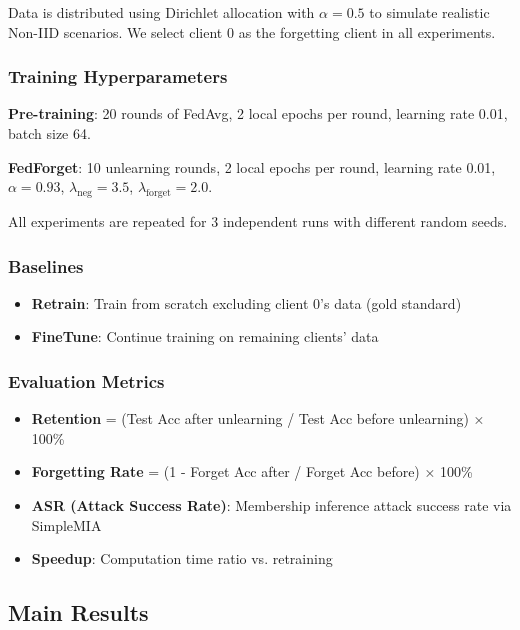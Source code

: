\documentclass[11pt,a4paper]{article}
\begin{document}
Data is distributed using Dirichlet allocation with $\alpha=0.5$ to simulate realistic Non-IID scenarios. We select client 0 as the forgetting client in all experiments.

\subsubsection{Training Hyperparameters}

\textbf{Pre-training}: 20 rounds of FedAvg, 2 local epochs per round, learning rate 0.01, batch size 64.

\textbf{FedForget}: 10 unlearning rounds, 2 local epochs per round, learning rate 0.01, $\alpha=0.93$, $\lambda_{\text{neg}}=3.5$, $\lambda_{\text{forget}}=2.0$.

All experiments are repeated for 3 independent runs with different random seeds.

\subsubsection{Baselines}

\begin{itemize}
\item \textbf{Retrain}: Train from scratch excluding client 0's data (gold standard)
\item \textbf{FineTune}: Continue training on remaining clients' data
\end{itemize}

\subsubsection{Evaluation Metrics}

\begin{itemize}
\item \textbf{Retention} = (Test Acc after unlearning / Test Acc before unlearning) × 100\%
\item \textbf{Forgetting Rate} = (1 - Forget Acc after / Forget Acc before) × 100\%
\item \textbf{ASR (Attack Success Rate)}: Membership inference attack success rate via SimpleMIA
\item \textbf{Speedup}: Computation time ratio vs. retraining
\end{itemize}

\subsection{Main Results}
\end{document}
